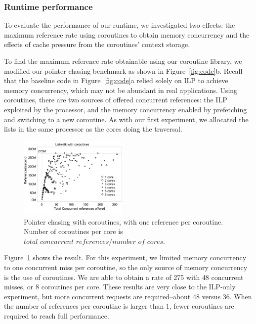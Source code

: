 \documentclass[10pt,nocopyrightspace,preprint]{sigplanconf}
\begin{document}
\subsubsection{Runtime performance}

To evaluate the performance of our runtime, we investigated two
effects: the maximum reference rate using coroutines
to obtain memory concurrency and the effects of cache pressure from the
coroutines' context storage. 

To find the maximum reference rate obtainable using our coroutine
library, we modified our pointer chasing benchmark as shown in
Figure~\ref{fig:code}b. Recall that the baseline code in Figure~\ref{fig:code}a relied solely on ILP to achieve memory concurrency, which may not be abundant in real applications. Using coroutines, there are two sources of offered
concurrent references: the ILP exploited by the processor, and the
memory concurrency enabled by prefetching and switching to a new
coroutine. As with our first experiment, we allocated the lists in the
same processor as the cores doing the traversal. 

\begin{figure}[h]
  \begin{center}
    \includegraphics[width=0.47\textwidth]{figures/multi-green-edited.pdf}
  \end{center}
  \caption{Pointer chasing with coroutines, with one reference per
    coroutine. Number of coroutines per core is $\textit{total concurrent references} / \textit{number of cores}$.}
  \label{fig:multi-green}
\end{figure}

Figure~\ref{fig:multi-green} shows the result. For this
experiment, we limited memory concurrency to one concurrent miss per
coroutine, so the only source of memory concurrency is the use of
coroutines. We are able to obtain a rate of 275 \mrps with 48 concurrent misses, or 8 coroutines per core. These
results are very close to the ILP-only experiment, but more concurrent requests are required--about 48 versus 36. When the number of references per coroutine is larger than 1, fewer coroutines are required to reach full performance.
\end{document}
